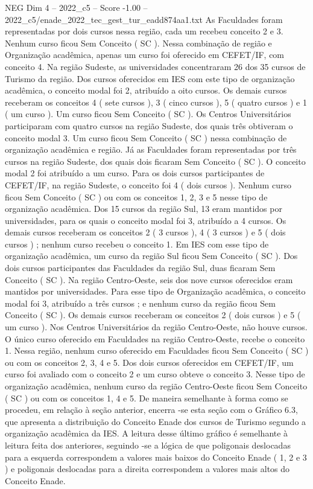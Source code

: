 \begin{textsample}{NEG Dim 4 – 2022\_c5 – Score -1.00 – 2022\_c5/enade\_2022\_tec\_gest\_tur\_eadd874aa1.txt}
As Faculdades foram representadas por dois cursos nessa região, cada um recebeu conceito 2 e 3.
Nenhum curso ficou Sem Conceito ( SC ).
Nessa combinação de região e Organização acadêmica, apenas um curso foi oferecido em CEFET/IF, com conceito 4.
Na região Sudeste, as universidades concentraram 26 dos 35 cursos de Turismo da região.
Dos cursos oferecidos em IES com este tipo de organização acadêmica, o conceito modal foi 2, atribuído a oito cursos.
Os demais cursos receberam os conceitos 4 ( sete cursos ), 3 ( cinco cursos ), 5 ( quatro cursos ) e 1 ( um curso ).
Um curso ficou Sem Conceito ( SC ).
Os Centros Universitários participaram com quatro cursos na região Sudeste, dos quais três obtiveram o conceito modal 3.
Um curso ficou Sem Conceito ( SC ) nessa combinação de organização acadêmica e região.
Já as Faculdades foram representadas por três cursos na região Sudeste, dos quais dois ficaram Sem Conceito ( SC ).
O conceito modal 2 foi atribuído a um curso.
Para os dois cursos participantes de CEFET/IF, na região Sudeste, o conceito foi 4 ( dois cursos ).
Nenhum curso ficou Sem Conceito ( SC ) ou com os conceitos 1, 2, 3 e 5 nesse tipo de organização acadêmica.
Dos 15 cursos da região Sul, 13 eram mantidos por universidades, para os quais o conceito modal foi 3, atribuído a 4 cursos.
Os demais cursos receberam os conceitos 2 ( 3 cursos ), 4 ( 3 cursos ) e 5 ( dois cursos ) ; nenhum curso recebeu o conceito 1.
Em IES com esse tipo de organização acadêmica, um curso da região Sul ficou Sem Conceito ( SC ).
Dos dois cursos participantes das Faculdades da região Sul, duas ficaram Sem Conceito ( SC ).
Na região Centro-Oeste, seis dos nove cursos oferecidos eram mantidos por universidades.
Para esse tipo de Organização acadêmica, o conceito modal foi 3, atribuído a três cursos ; e nenhum curso da região ficou Sem Conceito ( SC ).
Os demais cursos receberam os conceitos 2 ( dois cursos ) e 5 ( um curso ).
Nos Centros Universitários da região Centro-Oeste, não houve cursos.
O único curso oferecido em Faculdades na região Centro-Oeste, recebe o conceito 1.
Nessa região, nenhum curso oferecido em Faculdades ficou Sem Conceito ( SC ) ou com os conceitos 2, 3, 4 e 5.
Dos dois cursos oferecidos em CEFET/IF, um curso foi avaliado com o conceito 2 e um curso obteve o conceito 3.
Nesse tipo de organização acadêmica, nenhum curso da região Centro-Oeste ficou Sem Conceito ( SC ) ou com os conceitos 1, 4 e 5.
De maneira semelhante à forma como se procedeu, em relação à seção anterior, encerra -se esta seção com o Gráfico 6.3, que apresenta a distribuição do Conceito Enade dos cursos de Turismo segundo a organização acadêmica da IES.
A leitura desse último gráfico é semelhante à leitura feita dos anteriores, seguindo -se a lógica de que poligonais deslocadas para a esquerda correspondem a valores mais baixos do Conceito Enade ( 1, 2 e 3 ) e poligonais deslocadas para a direita correspondem a valores mais altos do Conceito Enade.

\end{textsample}
